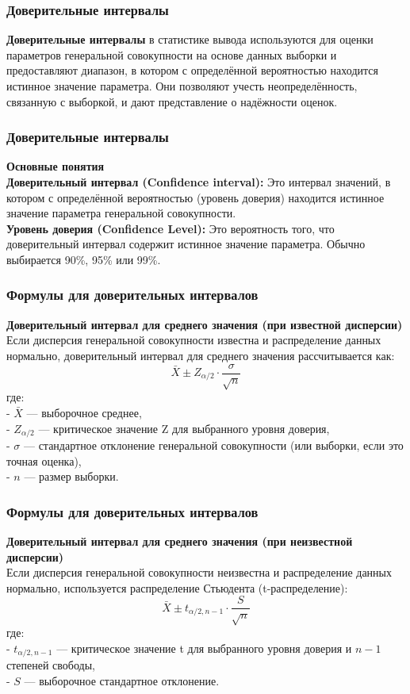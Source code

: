 \documentclass[aspectratio=169]{beamer}
\begin{document}
\begin{frame}
\frametitle{Доверительные интервалы}
{\bf Доверительные интервалы} в статистике вывода используются для оценки параметров генеральной совокупности на основе данных выборки и предоставляют диапазон, в котором с определённой вероятностью находится истинное значение параметра. Они позволяют учесть неопределённость, связанную с выборкой, и дают представление о надёжности оценок.
\end{frame}

\begin{frame}
\frametitle{Доверительные интервалы}
{\bf Основные понятия}
\newline\\
{\bf Доверительный интервал (Confidence interval):} Это интервал значений, в котором с определённой вероятностью (уровень доверия) находится истинное значение параметра генеральной совокупности.\\
{\bf Уровень доверия (Confidence Level):} Это вероятность того, что доверительный интервал содержит истинное значение параметра. Обычно выбирается 90\%, 95\% или 99\%.
\end{frame}

\begin{frame}
\frametitle{Формулы для доверительных интервалов}
{\bf Доверительный интервал для среднего значения (при известной дисперсии)}\\
Если дисперсия генеральной совокупности известна и распределение данных нормально, доверительный интервал для среднего значения рассчитывается как:
\[
\bar{X} \pm Z_{\alpha/2} \cdot \frac{\sigma}{\sqrt{n}}
\]
где:\\
- \( \bar{X} \) — выборочное среднее,\\
- \( Z_{\alpha/2} \) — критическое значение Z для выбранного уровня доверия,\\
- \( \sigma \) — стандартное отклонение генеральной совокупности (или выборки, если это точная оценка),\\
- \( n \) — размер выборки.
\end{frame}

\begin{frame}
\frametitle{Формулы для доверительных интервалов}
{\bf Доверительный интервал для среднего значения (при неизвестной дисперсии)}\\
Если дисперсия генеральной совокупности неизвестна и распределение данных нормально, используется распределение Стьюдента (t-распределение):
\[
\bar{X} \pm t_{\alpha/2, n-1} \cdot \frac{S}{\sqrt{n}}
\]
где:\\
- \( t_{\alpha/2, n-1} \) — критическое значение t для выбранного уровня доверия и \( n-1 \) степеней свободы,\\
- \( S \) — выборочное стандартное отклонение.
\end{frame}
\end{document}
